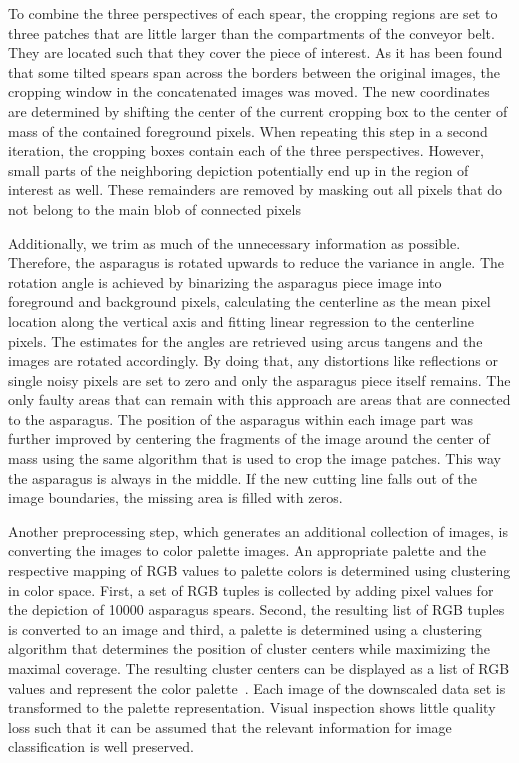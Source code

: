 To combine the three perspectives of each spear, the cropping regions are set to three patches that are little larger than the compartments of the conveyor belt. They are located such that they cover the piece of interest. As it has been found that some tilted spears span across the borders between the original images, the cropping window in the concatenated images was moved. The new coordinates are determined by shifting the center of the current cropping box to the center of mass of the contained foreground pixels. When repeating this step in a second iteration, the cropping boxes contain each of the three perspectives. However, small parts of the neighboring depiction potentially end up in the region of interest as well. These remainders are removed by masking out all pixels that do not belong to the main blob of connected pixels

Additionally, we trim as much of the unnecessary information as possible. Therefore, the asparagus is rotated upwards to reduce the variance in angle. The rotation angle is achieved by binarizing the asparagus piece image into foreground and background pixels, calculating the centerline as the mean pixel location along the vertical axis and fitting linear regression to the centerline pixels. The estimates for the angles are retrieved using arcus tangens and the images are rotated accordingly. By doing that, any distortions like reflections or single noisy pixels are set to zero and only the asparagus piece itself remains. The only faulty areas that can remain with this approach are areas that are connected to the asparagus. The position of the asparagus within each image part was further improved by centering the fragments of the image around the center of mass using the same algorithm that is used to crop the image patches. This way the asparagus is always in the middle. If the new cutting line falls out of the image boundaries, the missing area is filled with zeros. 

Another preprocessing step, which generates an additional collection of images, is converting the images to color palette images. An appropriate palette and the respective mapping of RGB values to palette colors is determined using clustering in color space. First, a set of RGB tuples is collected by adding pixel values for the depiction of 10000 asparagus spears. Second, the resulting list of RGB tuples is converted to an image and third, a palette is determined using a clustering algorithm that determines the position of cluster centers while maximizing the  maximal coverage. The resulting cluster centers can be displayed as a list of RGB values and represent the color palette~\citep{pil_quantization,zarandi2011large}. Each image of the downscaled data set is transformed to the palette representation. Visual inspection shows little quality loss such that it can be assumed that the relevant information for image classification is well preserved.

